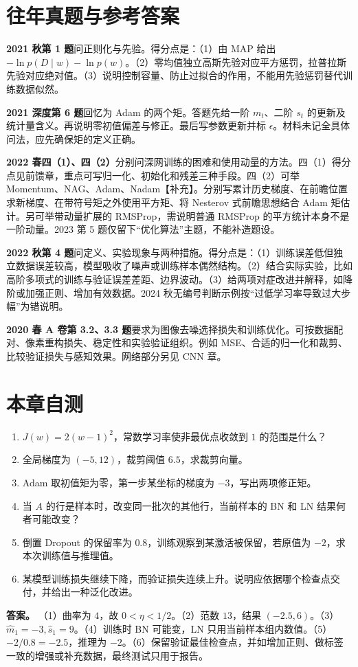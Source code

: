 \documentclass[UTF8,a4paper,zihao=-4,fontset=fandol]{ctexrep}
\begin{document}
\section{往年真题与参考答案}

\textbf{2021 秋第 1 题}问正则化与先验。得分点是：（1）由 MAP 给出 $-\ln p(D\mid w)-\ln p(w)$。（2）零均值独立高斯先验对应平方惩罚，拉普拉斯先验对应绝对值。（3）说明控制容量、防止过拟合的作用，不能用先验惩罚替代训练数据似然。

\textbf{2021 深度第 6 题}回忆为 Adam 的两个矩。答题先给一阶 $m_t$、二阶 $s_t$ 的更新及统计量含义。再说明零初值偏差与修正。最后写参数更新并标 $\epsilon$。材料未记全具体问法，应先确保矩的定义正确。

\textbf{2022 春四（1）、四（2）}分别问深网训练的困难和使用动量的方法。四（1）得分点见前馈章，重点可写归一化、初始化和残差三种手段。四（2）可举 Momentum、NAG、Adam、Nadam【补充】。分别写累计历史梯度、在前瞻位置求新梯度、在带符号矩之外使用平方矩、将 Nesterov 式前瞻思想结合 Adam 矩估计。另可举带动量扩展的 RMSProp，需说明普通 RMSProp 的平方统计本身不是一阶动量。2023 第 5 题仅留下“优化算法”主题，不能补造题设。

\textbf{2022 秋第 4 题}问定义、实验现象与两种措施。得分点是：（1）训练误差低但独立数据误差较高，模型吸收了噪声或训练样本偶然结构。（2）结合实际实验，比如高阶多项式的训练与验证误差差距、边界波动。（3）给两项对症改进并解释，如降阶或加强正则、增加有效数据。2024 秋无编号判断示例按“过低学习率导致过大步幅”为错说明。

\textbf{2020 春 A 卷第 3.2、3.3 题}要求为图像去噪选择损失和训练优化。可按数据配对、像素重构损失、稳定性和实验验证组织。例如 MSE、合适的归一化和裁剪、比较验证损失与感知效果。网络部分另见 CNN 章。

\section{本章自测}

\begin{enumerate}
\item $J(w)=2(w-1)^2$，常数学习率使非最优点收敛到 $1$ 的范围是什么？
\item 全局梯度为 $(-5,12)$，裁剪阈值 $6.5$，求裁剪向量。
\item Adam 取初值矩为零，第一步某坐标的梯度为 $-3$，写出两项修正矩。
\item 当 $A$ 的行是样本时，改变同一批次的其他行，当前样本的 BN 和 LN 结果何者可能改变？
\item 倒置 Dropout 的保留率为 $0.8$，训练观察到某激活被保留，若原值为 $-2$，求本次训练值与推理值。
\item 某模型训练损失继续下降，而验证损失连续上升。说明应依据哪个检查点交付，并给出一种泛化改进。
\end{enumerate}
\textbf{答案。} （1）曲率为 $4$，故 $0<\eta<1/2$。（2）范数 $13$，结果 $(-2.5,6)$。（3）$\widehat m_1=-3,\widehat s_1=9$。（4）训练时 BN 可能变，LN 只用当前样本组内数值。（5）$-2/0.8=-2.5$，推理为 $-2$。（6）保留验证最佳检查点，并如增加正则、做标签一致的增强或补充数据，最终测试只用于报告。
\end{document}
